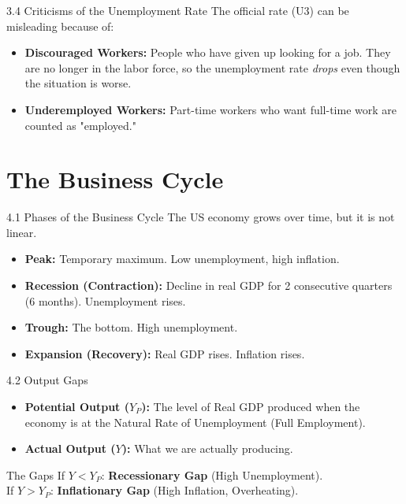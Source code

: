 \documentclass[aspectratio=169, 10pt]{beamer}
\begin{document}
\begin{frame}{3.4 Criticisms of the Unemployment Rate}
    The official rate (U3) can be misleading because of:
    
    \begin{itemize}
        \item \textbf{Discouraged Workers:} People who have given up looking for a job. They are no longer in the labor force, so the unemployment rate \textit{drops} even though the situation is worse.
        \item \textbf{Underemployed Workers:} Part-time workers who want full-time work are counted as "employed."
    \end{itemize}
\end{frame}

\section{The Business Cycle}

\begin{frame}{4.1 Phases of the Business Cycle}
    The US economy grows over time, but it is not linear.
    
    \begin{itemize}
        \item \textbf{Peak:} Temporary maximum. Low unemployment, high inflation.
        \item \textbf{Recession (Contraction):} Decline in real GDP for 2 consecutive quarters (6 months). Unemployment rises.
        \item \textbf{Trough:} The bottom. High unemployment.
        \item \textbf{Expansion (Recovery):} Real GDP rises. Inflation rises.
    \end{itemize}
\end{frame}

\begin{frame}{4.2 Output Gaps}
    \begin{itemize}
        \item \textbf{Potential Output ($Y_P$):} The level of Real GDP produced when the economy is at the Natural Rate of Unemployment (Full Employment).
        \item \textbf{Actual Output ($Y$):} What we are actually producing.
    \end{itemize}
    
    \vspace{0.5cm}
    \begin{alertblock}{The Gaps}
    If $Y < Y_P$: \textbf{Recessionary Gap} (High Unemployment).\\
    If $Y > Y_P$: \textbf{Inflationary Gap} (High Inflation, Overheating).
    \end{alertblock}
\end{frame}
\end{document}
